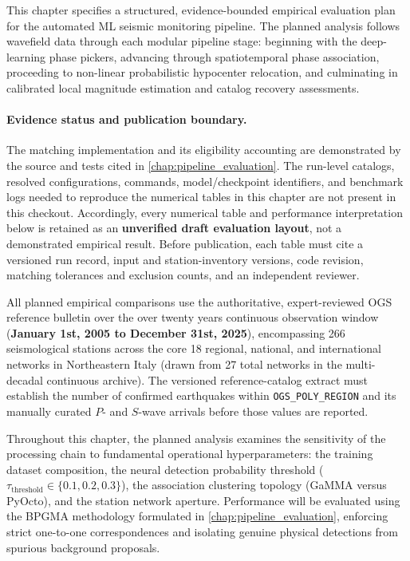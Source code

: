 
\label{chap:results}

This chapter specifies a structured, evidence-bounded empirical
evaluation plan for the automated \ac{ML} seismic monitoring
pipeline. The planned analysis follows wavefield data through each
modular pipeline stage: beginning with the deep-learning phase
pickers, advancing through spatiotemporal phase association,
proceeding to non-linear probabilistic hypocenter relocation, and
culminating in calibrated local magnitude estimation and catalog
recovery assessments.

\paragraph{Evidence status and publication boundary.} The matching
implementation and its eligibility accounting are demonstrated by
the source and tests cited in \cref{chap:pipeline_evaluation}. The
run-level catalogs, resolved configurations, commands,
model/checkpoint identifiers, and benchmark logs needed to reproduce
the numerical tables in this chapter are not present in this
checkout. Accordingly, every numerical table and performance
interpretation below is retained as an \textbf{unverified draft
evaluation layout}, not a demonstrated empirical result. Before
publication, each table must cite a versioned run record, input and
station-inventory versions, code revision, matching tolerances and
exclusion counts, and an independent reviewer.

All planned empirical comparisons use the authoritative,
expert-reviewed \ac{OGS} reference bulletin \parencite{SMINO} over the
over twenty years continuous observation window
(\textbf{January 1st, 2005 to December 31st, 2025}), encompassing \num{266}
seismological stations across the core \num{18} regional, national, and
international networks in Northeastern Italy (drawn from \num{27}
  total networks
in the multi-decadal continuous archive). The versioned
reference-catalog extract must
establish the number of confirmed earthquakes within
\texttt{OGS\_POLY\_REGION} and its manually curated $P$- and $S$-wave
arrivals before those values are reported.

Throughout this chapter, the planned analysis examines the sensitivity
of the processing chain to fundamental operational hyperparameters:
the training dataset composition, the neural detection probability
threshold ($\tau_{\mathrm{threshold}} \in \{0.1, 0.2, 0.3\}$), the
association clustering topology (\ac{GaMMA} versus \ac{PyOcto}), and
the station network aperture. Performance will be evaluated using the
\acf{BPGMA} methodology
formulated in \cref{chap:pipeline_evaluation}, enforcing strict
one-to-one correspondences and isolating genuine physical detections
from spurious background proposals.

